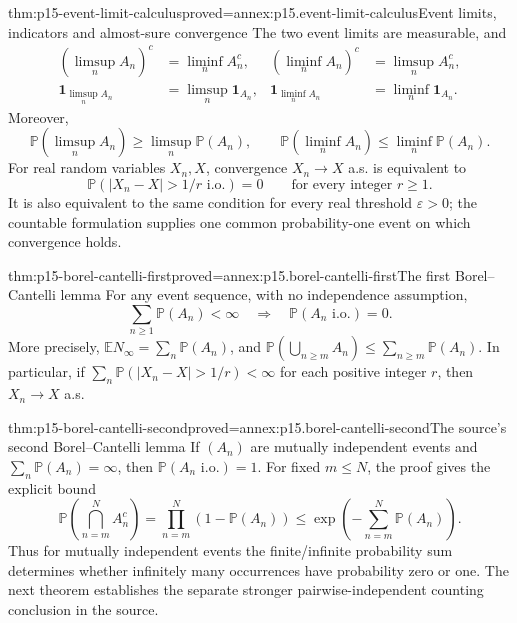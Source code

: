 \begin{hbtheorem}{thm:p15-event-limit-calculus}{proved=annex:p15.event-limit-calculus}{Event limits, indicators and almost-sure convergence}
The two event limits are measurable, and
\[
 \begin{aligned}
 (\limsup_n A_n)^c&=\liminf_n A_n^c,&
 (\liminf_n A_n)^c&=\limsup_n A_n^c,\\
 \mathbf1_{\limsup_n A_n}&=\limsup_n\mathbf1_{A_n},&
 \mathbf1_{\liminf_n A_n}&=\liminf_n\mathbf1_{A_n}.
 \end{aligned}
\]
Moreover,
\[
 \mathbb P(\limsup_n A_n)\geq\limsup_n\mathbb P(A_n),\qquad
 \mathbb P(\liminf_n A_n)\leq\liminf_n\mathbb P(A_n).
\]
For real random variables \(X_n,X\), convergence \(X_n\to X\)
a.s. is equivalent to
\[
 \mathbb P(|X_n-X|>1/r\text{ i.o.})=0
                        \qquad\text{for every integer }r\geq1.
\]
It is also equivalent to the same condition for every real threshold
\(\varepsilon>0\); the countable formulation supplies one common
probability-one event on which convergence holds.
\end{hbtheorem}

\begin{hbtheorem}{thm:p15-borel-cantelli-first}{proved=annex:p15.borel-cantelli-first}{The first Borel--Cantelli lemma}
For any event sequence, with no independence assumption,
\[
 \sum_{n\geq1}\mathbb P(A_n)<\infty
               \quad\Longrightarrow\quad
 \mathbb P(A_n\text{ i.o.})=0.
\]
More precisely,
\(\mathbb E N_\infty=\sum_n\mathbb P(A_n)\), and
\(\mathbb P(\bigcup_{n\geq m}A_n)\leq\sum_{n\geq m}\mathbb P(A_n)\).
In particular, if
\(\sum_n\mathbb P(|X_n-X|>1/r)<\infty\) for each positive integer
\(r\), then \(X_n\to X\) a.s.
\end{hbtheorem}

\begin{hbtheorem}{thm:p15-borel-cantelli-second}{proved=annex:p15.borel-cantelli-second}{The source's second Borel--Cantelli lemma}
If \((A_n)\) are mutually independent events and
\(\sum_n\mathbb P(A_n)=\infty\), then
\(\mathbb P(A_n\text{ i.o.})=1\).
For fixed \(m\leq N\), the proof gives the explicit bound
\[
 \mathbb P\left(\bigcap_{n=m}^N A_n^c\right)
   =\prod_{n=m}^N(1-\mathbb P(A_n))
   \leq\exp\left(-\sum_{n=m}^N\mathbb P(A_n)\right).
\]
Thus for mutually independent events the finite/infinite probability
sum determines whether infinitely many occurrences have probability
zero or one. The next theorem establishes the separate stronger
pairwise-independent counting conclusion in the source.
\end{hbtheorem}

